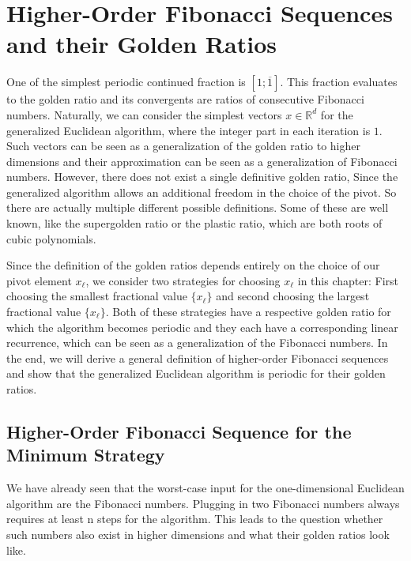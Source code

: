 \chapter{Higher-Order Fibonacci Sequences and their Golden Ratios}

One of the simplest periodic continued fraction is $[1; \overline{1}]$.
This fraction evaluates to the golden ratio and its convergents are ratios of
consecutive Fibonacci numbers.
Naturally, we can consider the simplest vectors $x ∈ ℝ^d$ for the generalized
Euclidean algorithm, where the integer part in each iteration is $1$.
Such vectors can be seen as a generalization of the golden
ratio to higher dimensions and their approximation can be seen as a
generalization of Fibonacci numbers.
However, there does not exist a single definitive golden ratio,
Since the generalized algorithm allows an additional freedom in the choice of the pivot.
So there are actually multiple different possible definitions.
Some of these are well known, like the supergolden ratio or the plastic ratio,
which are both roots of cubic polynomials.

Since the definition of the golden ratios depends entirely on the choice of our
pivot element $x_ℓ$, we consider two strategies for choosing $x_ℓ$ in this
chapter: First choosing the smallest fractional value $\{x_ℓ\}$ and second
choosing the largest fractional value $\{x_ℓ\}$.
Both of these strategies have a respective golden ratio for which the algorithm
becomes periodic and they each have a corresponding linear recurrence, which
can be seen as a generalization of the Fibonacci numbers.
In the end, we will derive a general definition of higher-order Fibonacci
sequences and show that the generalized Euclidean algorithm is periodic for
their golden ratios.

\section{Higher-Order Fibonacci Sequence for the Minimum Strategy}

We have already seen that the worst-case input for the one-dimensional
Euclidean algorithm are the Fibonacci numbers.
Plugging in two Fibonacci numbers always requires at least n steps for the
algorithm.
This leads to the question whether such numbers also exist in higher dimensions
and what their golden ratios look like.

